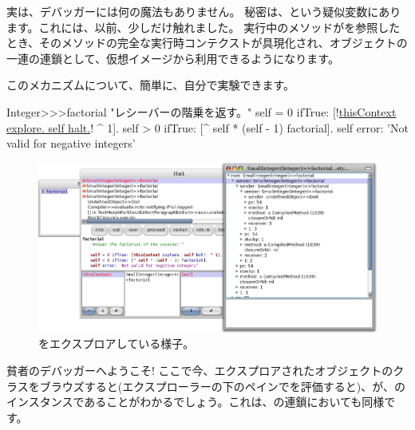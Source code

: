 \documentclass[a4paper,10pt,twoside]{book}
\begin{document}
実は、デバッガーには何の魔法もありません。
秘密は、という疑似変数にあります。これには、以前、少しだけ触れました。
実行中のメソッドがを参照したとき、そのメソッドの完全な実行時コンテクストが具現化され、オブジェクトの一連の連鎖として、仮想イメージから利用できるようになります。

このメカニズムについて、簡単に、自分で実験できます。


\begin{code}{}
Integer>>>factorial
	"レシーバーの階乗を返す。"
	self = 0 ifTrue: [!\underline{thisContext explore. self halt.}! ^ 1].
	self > 0 ifTrue: [^ self * (self - 1) factorial].
	self error: 'Not valid for negative integers'
\end{code}


\begin{figure}[ht]\centering
	\includegraphics[width=\linewidth]{exploringThisContext}
	\caption{をエクスプロアしている様子。}
\end{figure}

貧者のデバッガーへようこそ!
ここで今、エクスプロアされたオブジェクトのクラスをブラウズすると(\ie エクスプローラーの下のペインでを評価すると)、が、のインスタンスであることがわかるでしょう。これは、の連鎖においても同様です。
\end{document}
